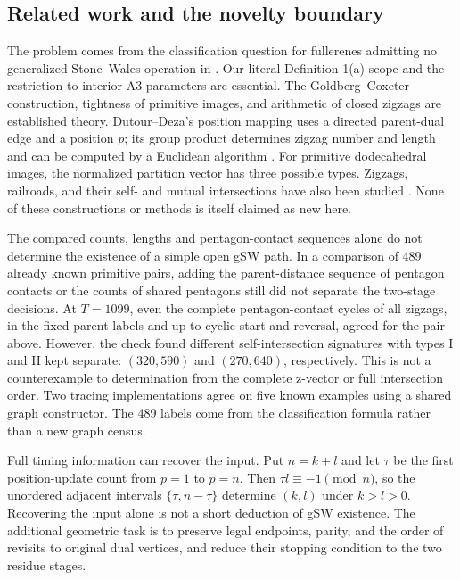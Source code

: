 \documentclass[11pt]{amsart}
\begin{document}
\subsection{Related work and the novelty boundary}
The problem comes from the classification question for fullerenes
admitting no generalized Stone--Wales operation in \cite{BBS}. Our
literal Definition 1(a) scope and the restriction to interior A3
parameters are essential. The Goldberg--Coxeter construction,
tightness of primitive images, and arithmetic of closed zigzags are
established theory. Dutour--Deza's position mapping uses a directed
parent-dual edge and a position $p$; its group product determines
zigzag number and length and can be computed by a Euclidean algorithm
\cite[Section 4, Theorems 4.5, 4.12, 6.5 and Proposition 4.14]{DD}.
For primitive dodecahedral images, the normalized partition vector has
three possible types. Zigzags, railroads, and their self- and mutual
intersections have also been studied \cite{ZZ,Knots}. None of these
constructions or methods is itself claimed as new here.

The compared counts, lengths and pentagon-contact sequences alone do
not determine the existence of a simple open gSW path. In a comparison of 489 already
known primitive pairs, adding the parent-distance sequence of pentagon
contacts or the counts of shared pentagons still did not separate
the two-stage decisions. At $T=1099$, even the complete pentagon-contact
cycles of all zigzags, in the fixed parent labels and up to cyclic
start and reversal, agreed for the pair above. However, the check found different self-intersection signatures with types I and II
kept separate: $(320,590)$ and $(270,640)$, respectively. This is not
a counterexample to determination from the complete z-vector or full
intersection order. Two tracing implementations agree on five known
examples using a shared graph constructor. The 489 labels come from
the classification formula rather than a new graph census.

Full timing information can recover the input. Put $n=k+l$ and let
$\tau$ be the first position-update count from $p=1$ to $p=n$.
Then $\tau l\equiv-1\pmod n$, so the unordered adjacent intervals
$\{\tau,n-\tau\}$ determine $(k,l)$ under $k>l>0$.
Recovering the input alone is not a short deduction of gSW existence.
The additional geometric task is to preserve legal endpoints, parity,
and the order of revisits to original dual vertices, and reduce their
stopping condition to the two residue stages.
\end{document}
